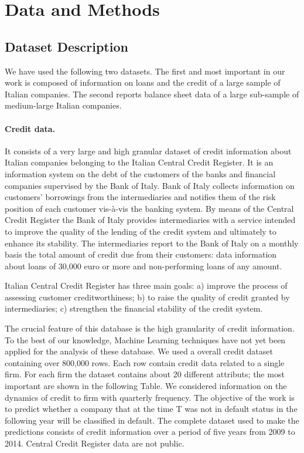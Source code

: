 \section{Data and Methods}
\label{sec:approach}

\subsection{Dataset Description}

We have used the following two datasets. The first and most important in our work is composed of information on loans and the credit of a large sample of Italian companies. The second reports balance sheet data of a large sub-sample of medium-large Italian companies.


\paragraph{Credit data.} 


It consists of a very large and high granular dataset of credit
information about Italian companies belonging to the Italian Central
Credit Register.
It is an information system on the debt
of the customers of the banks and financial companies supervised by the
Bank of Italy. Bank of Italy collects information on customers'
borrowings from the intermediaries and notifies them of the risk
position of each customer vis-à-vis the banking system.
By means of the Central Credit Register the Bank of Italy provides
intermediaries with a service intended to improve the quality of the
lending of the credit system and ultimately to enhance its stability.
The intermediaries report to the Bank of Italy on a monthly basis the
total amount of credit due from their customers: data information about
loans of 30,000 euro or more and non-performing loans of any amount.

Italian Central Credit Register has three main goals: a)
improve the process of assessing customer creditworthiness; b) to
raise the quality of credit granted by intermediaries; c) strengthen
the financial stability of the credit system. 




The crucial feature of this database is the high granularity of credit
information. To the best of our knowledge, Machine Learning techniques
have not yet been applied for the analysis of these database.
We used a overall credit dataset containing over 800,000 rows. Each row contain credit
data related to a single firm. For each firm the dataset contains about
20 different attributs; the most important are shown in the following
Table. We considered information on the dynamics
of credit to firm with quarterly frequency. The objective of the work is
to predict whether a company that at the time T was not in default
status in the following year will be classified in default. The complete
dataset used to make the predictions consists of credit information over
a period of five years from 2009 to 2014.
Central Credit Register data are not public.



